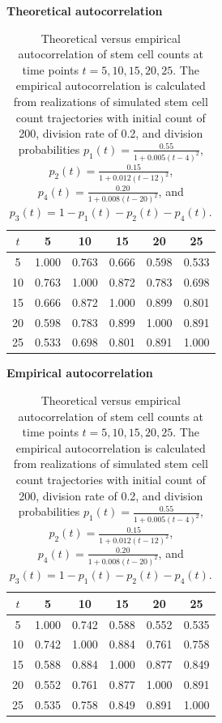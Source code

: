 \documentclass[pdflatex,sn-mathphys-num]{sn-jnl}
\theoremstyle{thmstyleone}%
\theoremstyle{thmstyletwo}%
\theoremstyle{thmstylethree}%
\begin{document}
\begin{table}[ht]
\centering

\begin{minipage}{0.48\textwidth}
\centering
\textbf{Theoretical autocorrelation}

\vspace{0.3em}
\footnotesize
\begin{tabular}{c ccccc}
\toprule
$t$ & 5 & 10 & 15 & 20 & 25 \\
\midrule
 5  & 1.000 & 0.763 & 0.666 & 0.598 & 0.533 \\
10  & 0.763 & 1.000 & 0.872 & 0.783 & 0.698 \\
15  & 0.666 & 0.872 & 1.000 & 0.899 & 0.801 \\
20  & 0.598 & 0.783 & 0.899 & 1.000 & 0.891 \\
25  & 0.533 & 0.698 & 0.801 & 0.891 & 1.000 \\
\bottomrule
\end{tabular}
\end{minipage}
\hfill
\begin{minipage}{0.48\textwidth}
\centering
\textbf{Empirical autocorrelation}

\vspace{0.3em}
\footnotesize
\begin{tabular}{c ccccc}
\toprule
$t$ & 5 & 10 & 15 & 20 & 25 \\
\midrule
 5  & 1.000 & 0.742 & 0.588 & 0.552 & 0.535 \\
10  & 0.742 & 1.000 & 0.884 & 0.761 & 0.758 \\
15  & 0.588 & 0.884 & 1.000 & 0.877 & 0.849 \\
20  & 0.552 & 0.761 & 0.877 & 1.000 & 0.891 \\
25  & 0.535 & 0.758 & 0.849 & 0.891 & 1.000 \\
\bottomrule
\end{tabular}
\end{minipage}

\caption{Theoretical versus empirical autocorrelation of stem cell counts at time points
$t = 5, 10, 15, 20, 25$. The empirical autocorrelation is calculated from realizations of
simulated stem cell count trajectories with initial count of 200, division rate of 0.2,
and division probabilities $p_1(t) = \frac{0.55}{1 + 0.005(t-4)^2}$,
$p_2(t) = \frac{0.15}{1 + 0.012(t-12)^2}$,
$p_4(t) = \frac{0.20}{1+0.008(t-20)^2}$,
and $p_3(t) = 1-p_1(t)-p_2(t)-p_4(t)$.}
\label{tab:autocorrelation}
\end{table}
\end{document}
